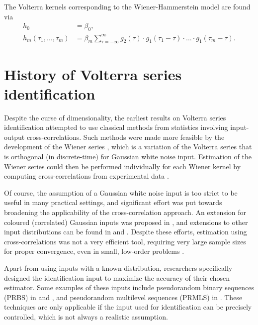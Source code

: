 The Volterra kernels corresponding to the Wiener-Hammerstein model are found via
\begin{align}
h_0 &= \beta_0, \nonumber \\
h_m(\tau_1,\hdots,\tau_m) &= \beta_m \sum\limits_{\tau=-\infty}^{\infty} g_2(\tau) \cdot g_1(\tau_1 - \tau) \cdot \hdots \cdot g_1(\tau_m - \tau).
\end{align}

\section{History of Volterra series identification}
\label{sec:VolterraID_History}

Despite the curse of dimensionality, the earliest results on Volterra series identification attempted to use classical methods from statistics involving input-output cross-correlations. Such methods were made more feasible by the development of the Wiener series \cite{Schetzen1974}, which is a variation of the Volterra series that is orthogonal (in discrete-time) for Gaussian white noise input. Estimation of the Wiener series could then be performed individually for each Wiener kernel by computing cross-correlations from experimental data \cite{Lee1965}.

Of course, the assumption of a Gaussian white noise input is too strict to be useful in many practical settings, and significant effort was put towards broadening the applicability of the cross-correlation approach. An extension for coloured (correlated) Gaussian inputs was proposed in \cite{Korenberg1990}, and extensions to other input distributions can be found in \cite{Ogura1972} and \cite{Segall1976}. Despite these efforts, estimation using cross-correlations was not a very efficient tool, requiring very large sample sizes for proper convergence, even in small, low-order problems \cite{Franz2006}.

Apart from using inputs with a known distribution, researchers specifically designed the identification input to maximize the accuracy of their chosen estimator. Some examples of these inputs include pseudorandom binary sequences (PRBS) in \cite{Sutter1987} and \cite{Reed1996}, and pseudorandom multilevel sequences (PRMLS) in \cite{Nowak1994}. These techniques are only applicable if the input used for identification can be precisely controlled, which is not always a realistic assumption.


